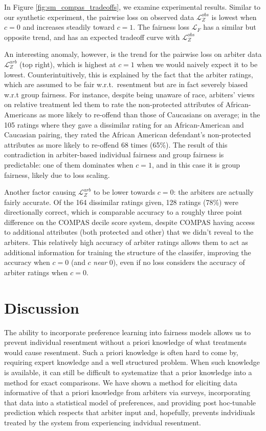         In Figure \ref{fig:sm_compas_tradeoffs}, we examine experimental results.  Similar to our synthetic experiment, the pairwise loss on observed data $\mathcal{L}_Z^{obs}$ is lowest when $c = 0$ and increases steadily toward $c = 1$.  The fairness loss $\mathcal{L}_F$ has a similar but opposite trend, and has an expected tradeoff curve with $\mathcal{L}_Z^{obs}$
        
        An interesting anomaly, however, is the trend for the pairwise loss on arbiter data $\mathcal{L}_Z^{arb}$ (top right), which is highest at $c = 1$ when we would naively expect it to be lowest.  Counterintuitively, this is explained by the fact that the arbiter ratings, which are assumed to be fair w.r.t.~resentment but are in fact severely biased w.r.t group fairness.  For instance, despite being unaware of race, arbiters' views on relative treatment led them to rate the non-protected attributes of African-Americans as more likely to re-offend than those of Caucasians on average; in the 105 ratings where they gave a dissimilar rating for an African-American and Caucasian pairing, they rated the African American defendant's non-protected attributes as more likely to re-offend 68 times (65\%). The result of this contradiction in arbiter-based individual fairness and group fairness is predictable: one of them dominates when $c=1$, and in this case it is group fairness, likely due to loss scaling.  
        
        Another factor causing $\mathcal{L}_Z^{arb}$ to be lower towards $c=0$: the arbiters are actually fairly accurate.  Of the 164 dissimilar ratings given, 128 ratings (78\%) were directionally correct, which is comparable accuracy to a roughly three point difference on the COMPAS decile score system, despite COMPAS having access to additional attributes (both protected and other) that we didn't reveal to the arbiters. This relatively high accuracy of arbiter ratings allows them to act as additional information for training the structure of the classifer, improving the accuracy when $c=0$ (and $c$ \emph{near} 0), even if no loss considers the accuracy of arbiter ratings when $c = 0$. 
        
    \section{Discussion}\label{sec:sm_discussion}
    
        The ability to incorporate preference learning into fairness models allows us to prevent individual resentment without a priori knowledge of what treatments would cause resentment.  Such a priori knowledge is often hard to come by, requiring expert knowledge and a well structured problem.  When such knowledge is available, it can still be difficult to systematize that a prior knowledge into a method for exact comparisons.  We have shown a method for eliciting data informative of that a priori knowledge from arbiters via surveys, incorporating that data into a statistical model of preferences, and providing post hoc-tunable prediction which respects that arbiter input and, hopefully, prevents indvidiuals treated by the system from experiencing indvidual resentment. 
        
